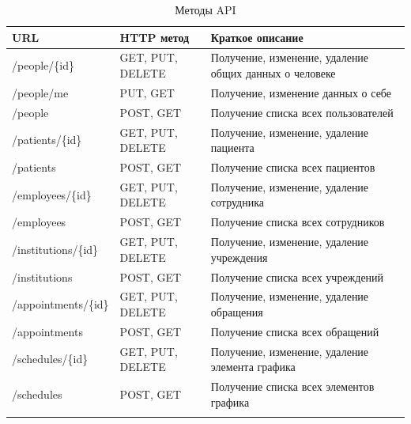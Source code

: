 \documentclass[a4paper,article]{article}
\begin{document}
    \begin{xltabular}{\textwidth} { |
        >{\hsize} X |
        >{\hsize} X |
        >{\hsize} X | }

        \hline
        URL & HTTP метод & Краткое описание \\

        \hline
        /people/\{id\}
        & GET, PUT, DELETE
        & Получение, изменение, удаление общих данных о человеке \\

        \hline
        /people/me
        & PUT, GET
        & Получение, изменение данных о себе \\

        \hline
        /people
        & POST, GET
        & Получение списка всех пользователей \\

        \hline
        /patients/\{id\}
        & GET, PUT, DELETE
        & Получение, изменение, удаление пациента \\

        \hline
        /patients
        & POST, GET
        & Получение списка всех пациентов \\

        \hline
        /employees/\{id\}
        & GET, PUT, DELETE
        & Получение, изменение, удаление сотрудника \\

        \hline
        /employees
        & POST, GET
        & Получение списка всех сотрудников \\

        \hline
        /institutions/\{id\}
        & GET, PUT, DELETE
        & Получение, изменение, удаление учреждения  \\

        \hline
        /institutions
        & POST, GET
        & Получение списка всех учреждений \\

        \hline
        /appointments/\{id\}
        & GET, PUT, DELETE
        & Получение, изменение, удаление обращения \\

        \hline
        /appointments
        & POST, GET
        & Получение списка всех обращений \\

        \hline
        /schedules/\{id\}
        & GET, PUT, DELETE
        & Получение, изменение, удаление элемента графика \\

        \hline
        /schedules
        & POST, GET
        & Получение списка всех элементов графика \\

        \hline

        \caption{\centering Методы API}

        \label{tab:Методы API}
    \end{xltabular}
\end{document}
